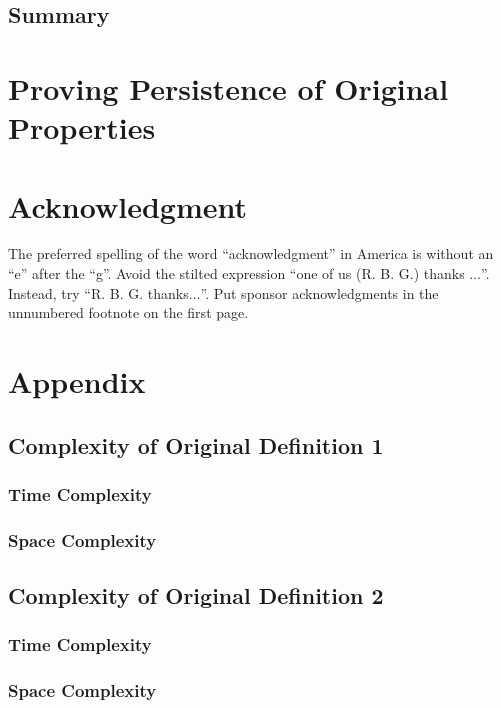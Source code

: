 \documentclass[conference]{IEEEtran}
\begin{document}
\subsection{Summary}

\section{Proving Persistence of Original Properties}

\section{Acknowledgment}

The preferred spelling of the word ``acknowledgment'' in America is without 
an ``e'' after the ``g''. Avoid the stilted expression ``one of us (R. B. 
G.) thanks $\ldots$''. Instead, try ``R. B. G. thanks$\ldots$''. Put sponsor 
acknowledgments in the unnumbered footnote on the first page.

\section{Appendix}

\subsection{Complexity of Original Definition 1}

\subsubsection{Time Complexity}

\subsubsection{Space Complexity}

\subsection{Complexity of Original Definition 2}

\subsubsection{Time Complexity}

\subsubsection{Space Complexity}
\end{document}
